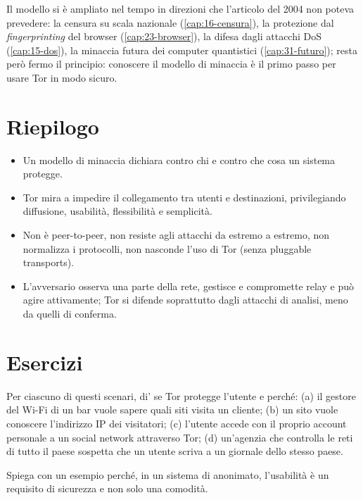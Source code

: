 Il modello si è ampliato nel tempo in direzioni che l'articolo del 2004 non poteva prevedere: la censura su scala nazionale (\cref{cap:16-censura}), la protezione dal \emph{fingerprinting} del browser (\cref{cap:23-browser}), la difesa dagli attacchi DoS (\cref{cap:15-dos}), la minaccia futura dei computer quantistici (\cref{cap:31-futuro}); resta però fermo il principio: conoscere il modello di minaccia è il primo passo per usare Tor in modo sicuro.

\section*{Riepilogo}
\begin{itemize}
  \item Un modello di minaccia dichiara contro chi e contro che cosa un sistema protegge.
  \item Tor mira a impedire il collegamento tra utenti e destinazioni, privilegiando diffusione, usabilità, flessibilità e semplicità.
  \item Non è peer-to-peer, non resiste agli attacchi da estremo a estremo, non normalizza i protocolli, non nasconde l'uso di Tor (senza pluggable transports).
  \item L'avversario osserva una parte della rete, gestisce e compromette relay e può agire attivamente; Tor si difende soprattutto dagli attacchi di analisi, meno da quelli di conferma.
\end{itemize}

\section*{Esercizi}

\begin{esercizio}[1]\label{es:04-casi}
Per ciascuno di questi scenari, di' se Tor protegge l'utente e perché: (a) il gestore del Wi-Fi di un bar vuole sapere quali siti visita un cliente; (b) un sito vuole conoscere l'indirizzo IP dei visitatori; (c) l'utente accede con il proprio account personale a un social network attraverso Tor; (d) un'agenzia che controlla le reti di tutto il paese sospetta che un utente scriva a un giornale dello stesso paese.
\end{esercizio}

\begin{esercizio}[2]\label{es:04-usabilita}
Spiega con un esempio perché, in un sistema di anonimato, l'usabilità è un requisito di sicurezza e non solo una comodità.
\end{esercizio}

